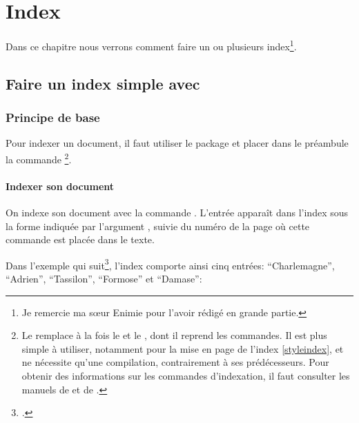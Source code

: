 \chapter{Index}

\begin{intro}

Dans ce chapitre nous verrons comment faire un ou plusieurs index\footnote{Je remercie ma sœur Enimie pour l'avoir rédigé en grande partie.}.

\end{intro}


\section{Faire un index simple avec }


\subsection{Principe de base}


Pour indexer un document, il faut utiliser le package  et placer  dans le préambule la commande \footnote{Le  remplace à la fois le   et le  , dont il reprend les commandes. Il est plus simple à utiliser, notamment pour la mise en page de l'index \ref{styleindex}, et ne nécessite qu'une compilation, contrairement à ses prédécesseurs. Pour obtenir des informations sur les commandes d'indexation, il faut consulter les manuels de  et de .}.

\begin{latexcode}
\usepackage{imakeidx}
\makeindex
\end{latexcode}

\subsubsection{Indexer son document}



On indexe son document avec  la commande \label{cmdindex}. L'entrée apparaît dans l'index sous la forme indiquée par l'argument , suivie du numéro de la page où cette commande est placée dans le texte. 

Dans l'exemple qui suit\footcite{eginhard}, l'index comporte ainsi cinq entrées: \enquote{Charlemagne}, \enquote{Adrien}, \enquote{Tassilon}, \enquote{Formose} et \enquote{Damase}:

